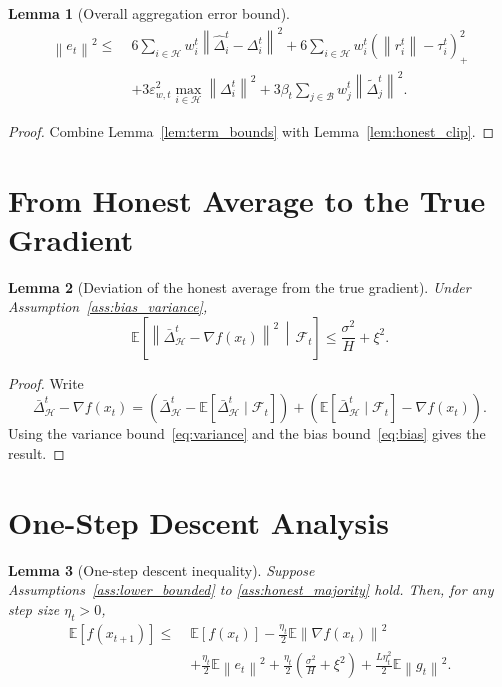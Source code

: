 \documentclass[11pt,a4paper]{article}
\newtheorem{lemma}{Lemma}
\theoremstyle{remark}
\newcommand{\E}{\mathbb{E}}
\newcommand{\F}{\mathcal{F}}
\newcommand{\HH}{\mathcal{H}}
\newcommand{\BB}{\mathcal{B}}
\newcommand{\norm}[1]{\left\lVert #1 \right\rVert}
\begin{document}
\begin{lemma}[Overall aggregation error bound]
\label{lem:agg_bound}
\begin{align}
    \norm{e_t}^2
    \le\;&
    6\sum_{i \in \HH} w_i^t \norm{\hat{\Delta}_i^t-\Delta_i^t}^2
    +
    6\sum_{i \in \HH} w_i^t (\norm{r_i^t}-\tau_i^t)_+^2
    \nonumber\\
    &+
    3\varepsilon_{w,t}^2 \max_{i\in\HH}\norm{\Delta_i^t}^2
    +
    3\beta_t \sum_{j\in\BB} w_j^t \norm{\tilde{\Delta}_j^t}^2.
    \label{eq:agg_error_final}
\end{align}
\end{lemma}

\begin{proof}
Combine Lemma~\ref{lem:term_bounds} with
Lemma~\ref{lem:honest_clip}.
\end{proof}

\section{From Honest Average to the True Gradient}

\begin{lemma}[Deviation of the honest average from the true gradient]
\label{lem:honest_gradient}
Under Assumption~\ref{ass:bias_variance},
\begin{equation}
    \E\!\left[
        \norm{\bar{\Delta}_{\HH}^t - \nabla f(x_t)}^2
        \,\middle|\, \F_t
    \right]
    \le
    \frac{\sigma^2}{H} + \xi^2.
    \label{eq:honest_gradient_gap}
\end{equation}
\end{lemma}

\begin{proof}
Write
\[
    \bar{\Delta}_{\HH}^t - \nabla f(x_t)
    =
    \left(
        \bar{\Delta}_{\HH}^t -
        \E[\bar{\Delta}_{\HH}^t \mid \F_t]
    \right)
    +
    \left(
        \E[\bar{\Delta}_{\HH}^t \mid \F_t] - \nabla f(x_t)
    \right).
\]
Using the variance bound~\eqref{eq:variance} and the bias bound~\eqref{eq:bias}
gives the result.
\end{proof}

\section{One-Step Descent Analysis}

\begin{lemma}[One-step descent inequality]
\label{lem:descent}
Suppose Assumptions~\ref{ass:lower_bounded} to \ref{ass:honest_majority}
hold.
Then, for any step size \(\eta_t > 0\),
\begin{align}
    \E[f(x_{t+1})]
    \le\;&
    \E[f(x_t)]
    -
    \frac{\eta_t}{2}\E\norm{\nabla f(x_t)}^2
    \nonumber\\
    &+
    \frac{\eta_t}{2} \E\norm{e_t}^2
    +
    \frac{\eta_t}{2}\left(\frac{\sigma^2}{H}+\xi^2\right)
    +
    \frac{L\eta_t^2}{2}\E\norm{g_t}^2.
    \label{eq:descent}
\end{align}
\end{lemma}
\end{document}
